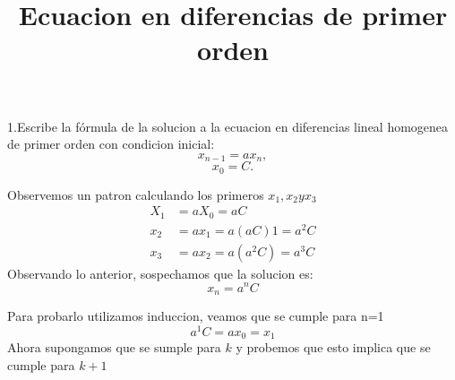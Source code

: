 \documentclass{article}
\begin{document}
\title{Ecuacion en diferencias de primer orden}
1.Escribe la fórmula de la solucion a la ecuacion en diferencias lineal homogenea de primer orden con condicion inicial:
$$x_{n-1}=ax_n,$$
$$x_0=C.$$

Observemos un patron calculando los primeros $x_1,x_2 y x_3$
\begin{align*}
X_1&=aX_0=aC\\
x_2&=ax_1=a(aC)1=a^2C\\
x_3&=ax_2=a(a^2C)=a^3C
\end{align*}
Observando lo anterior, sospechamos que la solucion es: $$x_n=a^nC$$

Para probarlo utilizamos induccion, veamos que se cumple para n=1 $$a^1C=ax_0=x_1$$
Ahora supongamos que se sumple para $k$ y probemos que esto implica que se cumple para $k+1$
\end{document}
